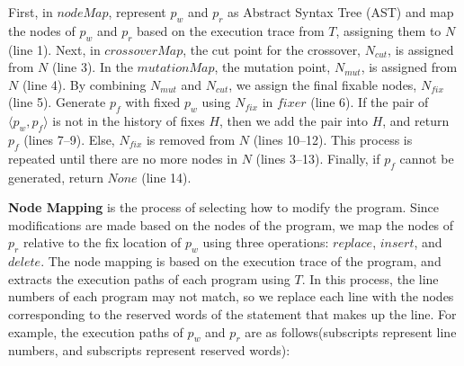 \documentclass[10pt,conference]{IEEEtran}
\begin{document}
        First, in $nodeMap$, represent $p_{w}$ and $p_{r}$ as Abstract Syntax Tree (AST) and map the nodes of $p_{w}$ and $p_{r}$ based on the execution trace from $T$, assigning them to $N$ (line 1). Next, in $crossoverMap$, the cut point for the crossover, $N_{cut}$, is assigned from $N$ (line 3). In the $mutationMap$, the mutation point, $N_{mut}$, is assigned from $N$ (line 4). By combining $N_{mut}$ and $N_{cut}$, we assign the final fixable nodes, $N_{fix}$ (line 5). Generate $p_{f}$ with fixed $p_{w}$ using $N_{fix}$ in $fixer$ (line 6). If the pair of $\langle p_{w}, p_{f} \rangle$ is not in the history of fixes $H$, then we add the pair into $H$, and return $p_{f}$ (lines 7–9). Else, $N_{fix}$ is removed from $N$ (lines 10–12). This process is repeated until there are no more nodes in $N$ (lines 3–13). Finally, if $p_{f}$ cannot be generated, return $None$ (line 14).

        \textbf{Node Mapping}\label{nodeMap} is the process of selecting how to modify the program. Since modifications are made based on the nodes of the program, we map the nodes of $p_{r}$ relative to the fix location of $p_{w}$ using three operations: $replace$, $insert$, and $delete$. The node mapping is based on the execution trace of the program, and extracts the execution paths of each program using $T$. In this process, the line numbers of each program may not match, so we replace each line with the nodes corresponding to the reserved words of the statement that makes up the line. For example, the execution paths of $p_{w}$ and $p_{r}$ are as follows(subscripts represent line numbers, and subscripts represent reserved words): 
        
\end{document}
